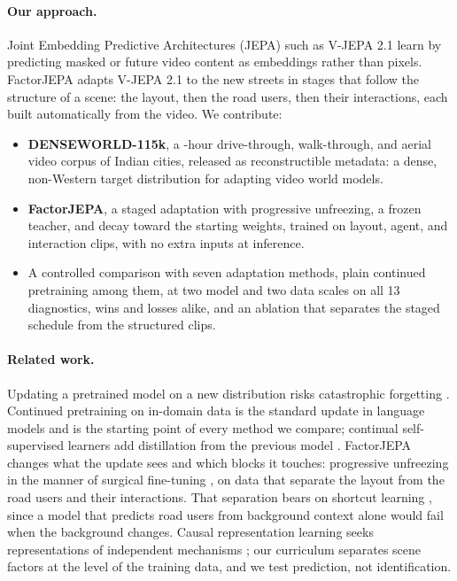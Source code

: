 \documentclass[letterpaper]{article} %
\begin{document}
\paragraph{Our approach.} Joint Embedding Predictive Architectures (JEPA) such as V-JEPA 2.1 \cite{murlabadia2026vjepa21} learn by predicting masked or future video content as embeddings rather than pixels. FactorJEPA adapts V-JEPA 2.1 to the new streets in stages that follow the structure of a scene: the layout, then the road users, then their interactions, each built automatically from the video. We contribute:
\begin{itemize}
    \item \textbf{DENSEWORLD-115k}, a \nHours{}-hour drive-through, walk-through, and aerial video corpus of \nCities{} Indian cities, released as reconstructible metadata: a dense, non-Western target distribution for adapting video world models.
    \item \textbf{FactorJEPA}, a staged adaptation with progressive unfreezing, a frozen teacher, and decay toward the starting weights, trained on layout, agent, and interaction clips, with no extra inputs at inference.
    \item A controlled comparison with seven adaptation methods, plain continued pretraining among them, at two model and two data scales on all 13 diagnostics, wins and losses alike, and an ablation that separates the staged schedule from the structured clips.
\end{itemize}

\paragraph{Related work.} Updating a pretrained model on a new distribution risks catastrophic forgetting \cite{kirkpatrick2017overcoming}. Continued pretraining on in-domain data is the standard update in language models \cite{gururangan2020dont} and is the starting point of every method we compare; continual self-supervised learners add distillation from the previous model \cite{fini2022self}. FactorJEPA changes what the update sees and which blocks it touches: progressive unfreezing in the manner of surgical fine-tuning \cite{lee2023surgical}, on data that separate the layout from the road users and their interactions. That separation bears on shortcut learning \cite{geirhos2020shortcut}, since a model that predicts road users from background context alone would fail when the background changes. Causal representation learning seeks representations of independent mechanisms \cite{scholkopf2021toward}; our curriculum separates scene factors at the level of the training data, and we test prediction, not identification.
\end{document}
